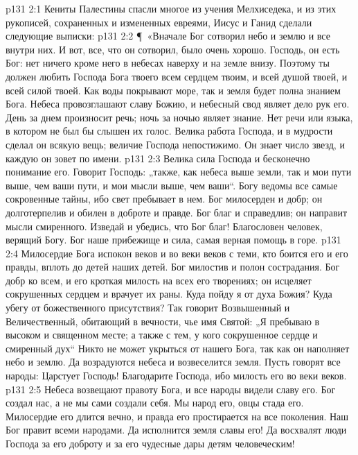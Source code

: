 \vs p131 2:1 Кениты Палестины спасли многое из учения Мелхиседека, и из этих рукописей, сохраненных и измененных евреями, Иисус и Ганид сделали следующие выписки:
\vs p131 2:2 \P\ «Вначале Бог сотворил небо и землю и все внутри них. И вот, все, что он сотворил, было очень хорошо. Господь, он есть Бог: нет ничего кроме него в небесах наверху и на земле внизу. Поэтому ты должен любить Господа Бога твоего всем сердцем твоим, и всей душой твоей, и всей силой твоей. Как воды покрывают море, так и земля будет полна знанием Бога. Небеса провозглашают славу Божию, и небесный свод являет дело рук его. День за днем произносит речь; ночь за ночью являет знание. Нет речи или языка, в котором не был бы слышен их голос. Велика работа Господа, и в мудрости сделал он всякую вещь; величие Господа непостижимо. Он знает число звезд, и каждую он зовет по имени.
\vs p131 2:3 Велика сила Господа и бесконечно понимание его. Говорит Господь: „также, как небеса выше земли, так и мои пути выше, чем ваши пути, и мои мысли выше, чем ваши“. Богу ведомы все самые сокровенные тайны, ибо свет пребывает в нем. Бог милосерден и добр; он долготерпелив и обилен в доброте и правде. Бог благ и справедлив; он направит мысли смиренного. Изведай и убедись, что Бог благ! Благословен человек, верящий Богу. Бог наше прибежище и сила, самая верная помощь в горе.
\vs p131 2:4 Милосердие Бога испокон веков и во веки веков с теми, кто боится его и его правды, вплоть до детей наших детей. Бог милостив и полон сострадания. Бог добр ко всем, и его кроткая милость на всех его творениях; он исцеляет сокрушенных сердцем и врачует их раны. Куда пойду я от духа Божия? Куда убегу от божественного присутствия? Так говорит Возвышенный и Величественный, обитающий в вечности, чье имя Святой: „Я пребываю в высоком и священном месте; а также с тем, у кого сокрушенное сердце и смиренный дух“ Никто не может укрыться от нашего Бога, так как он наполняет небо и землю. Да возрадуются небеса и возвеселится земля. Пусть говорят все народы: Царстует Господь! Благодарите Господа, ибо милость его во веки веков.
\vs p131 2:5 Небеса возвещают правоту Бога, и все народы видели славу его. Бог создал нас, а не мы сами создали себя. Мы народ его, овцы стада его. Милосердие его длится вечно, и правда его простирается на все поколения. Наш Бог правит всеми народами. Да исполнится земля славы его! Да восхвалят люди Господа за его доброту и за его чудесные дары детям человеческим!
